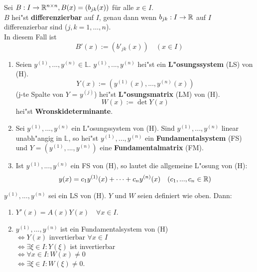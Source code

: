 \documentclass[a4paper,twoside,DIV15,BCOR12mm,chapterprefix=true,headings=twolinechapter]{scrbook}
\begin{document}
\begin{definition}
Sei $B : I \to \mathbb{R}^{n \times n}, B(x) = \left( b_{jk}(x) \right)$ für alle $x\in I$.\\ 
$B$ hei"st \textbf{differenzierbar} auf $I$, genau dann wenn $b_{jk} : I \to \mathbb{R}$
auf $I$ differenzierbar sind ($j,k = 1,\ldots, n$).\\
In diesem Fall ist 
\[B'(x) := (b'_{jk}(x)) \quad (x\in I)\]
\end{definition}

\begin{definition}
\begin{enumerate}
\item Seien $y^{(1)}, ..., y^{(n)} \in \mathbb{L}$. $y^{(1)}, ..., y^{(n)}$ 
hei"st ein \textbf{L"osungssystem} (LS) von (H). 
\[Y(x) := (y^{(1)}(x), ..., y^{(n)}(x))\]
(j-te Spalte von $Y$  =  $y^{(j)}$) hei"st \textbf{L"osungsmatrix} (LM) von (H).
\[W(x) := \det Y(x)\] 
hei"st \textbf{Wronskideterminante}.
\item Sei $y^{(1)}, ..., y^{(n)}$ ein L"osungssystem von (H). Sind 
$y^{(1)}, ..., y^{(n)}$ linear unabh"angig in $\mathbb{L}$, so hei"st 
$y^{(1)}, ..., y^{(n)}$ ein \textbf{Fundamentalsystem} (FS) und 
$Y = (y^{(1)}, ..., y^{(n)})$ eine \textbf{Fundamentalmatrix} (FM).
\item Ist $y^{(1)}, ..., y^{(n)}$ ein FS von (H), so lautet die allgemeine L"osung von (H): 
\[y(x) = c_1 y^{(1)}(x) + \cdots + c_n y^{(n)} (x) \quad (c_1, ..., c_n \in \mathbb{R})\]
\end{enumerate}
\end{definition}

\begin{satz}
$y^{(1)}, ..., y^{(n)}$ sei ein LS von (H). $Y$ und $W$ seien definiert wie oben. Dann:\begin{enumerate}
\item $Y'(x) = A(x)Y(x) \quad \forall x \in I$.
\item $y^{(1)}, ..., y^{(n)}$ ist ein Fundamentalsystem von (H)\\ $\iff Y(x) \text{ invertierbar } \forall x \in I$ \\ $\iff \exists \xi \in I: Y(\xi )$ ist invertierbar \\ $\iff \forall x \in I: W(x) \neq 0$ \\ $\iff \exists \xi \in I: W(\xi ) \neq 0$.
\end{enumerate}
\end{satz}
\end{document}
